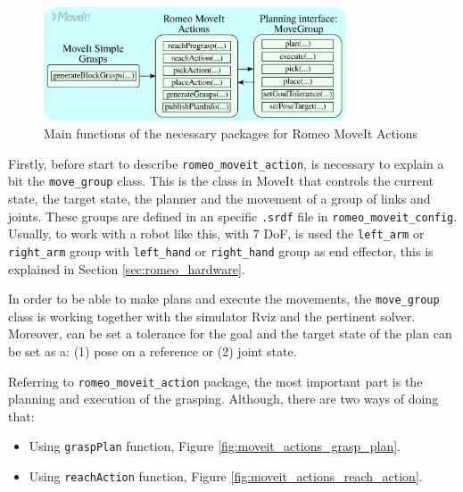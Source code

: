 \documentclass[12pt,a4paper,final,twoside,openright]{report}
\begin{document}
\begin{figure}[h]
\centering
\includegraphics[width=0.8\textwidth]{images/moveit_internal.eps}
\caption{Main functions of the necessary packages for Romeo MoveIt Actions\label{fig:moveit_internal}}
\end{figure}

Firstly, before start to describe \texttt{romeo\_moveit\_action}, is necessary to explain a bit the \texttt{move\_group} class. This is the class in MoveIt that controls the current state, the target state, the planner and the movement of a group of links and joints. These groups are defined in an specific \texttt{.srdf} file in \texttt{romeo\_moveit\_config}. Usually, to work with a robot like this, with 7 DoF, is used the \texttt{left\_arm} or \texttt{right\_arm} group with \texttt{left\_hand} or \texttt{right\_hand} group as end effector, this is explained in Section \ref{sec:romeo_hardware}.

In order to be able to make plans and execute the movements, the \texttt{move\_group} class is working together with the simulator Rviz and the pertinent solver. Moreover, can be set a tolerance for the goal and the target state of the plan can be set as a: (1) pose on a reference or (2) joint state.

Referring to \texttt{romeo\_moveit\_action} package, the most important part is the planning and execution of the grasping. Although, there are two ways of doing that: 

\begin{itemize}
\item Using \texttt{graspPlan} function, Figure \ref{fig:moveit_actions_grasp_plan}.
\item Using \texttt{reachAction} function, Figure \ref{fig:moveit_actions_reach_action}.
\end{itemize}
\end{document}
